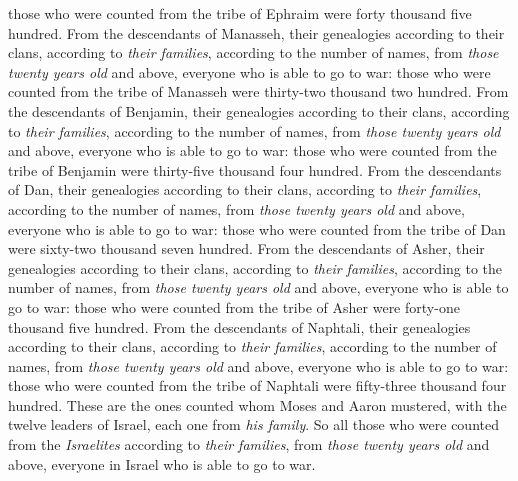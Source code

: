 \begin{biblechapter}
\verse those who were counted from the tribe of Ephraim were forty thousand five hundred.
\verse From the descendants of Manasseh, their genealogies according to their clans, according to \textit{their families}, according to the number of names, from \textit{those twenty years old} and above, everyone who is able to go to war:
\verse those who were counted from the tribe of Manasseh were thirty-two thousand two hundred.
\verse From the descendants of Benjamin, their genealogies according to their clans, according to \textit{their families}, according to the number of names, from \textit{those twenty years old} and above, everyone who is able to go to war:
\verse those who were counted from the tribe of Benjamin were thirty-five thousand four hundred.
\verse From the descendants of Dan, their genealogies according to their clans, according to \textit{their families}, according to the number of names, from \textit{those twenty years old} and above, everyone who is able to go to war:
\verse those who were counted from the tribe of Dan were sixty-two thousand seven hundred.
\verse From the descendants of Asher, their genealogies according to their clans, according to \textit{their families}, according to the number of names, from \textit{those twenty years old} and above, everyone who is able to go to war:
\verse those who were counted from the tribe of Asher were forty-one thousand five hundred.
\verse From the descendants of Naphtali, their genealogies according to their clans, according to \textit{their families}, according to the number of names, from \textit{those twenty years old} and above, everyone who is able to go to war:
\verse those who were counted from the tribe of Naphtali were fifty-three thousand four hundred.
\verse These are the ones counted whom Moses and Aaron mustered, with the twelve leaders of Israel, each one from \textit{his family}.
\verse So all those who were counted from the \textit{Israelites} according to \textit{their families}, from \textit{those twenty years old} and above, everyone in Israel who is able to go to war.

\end{biblechapter}
